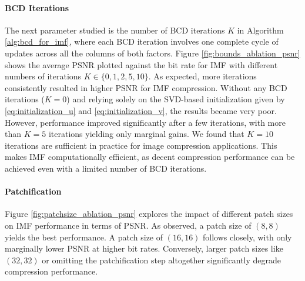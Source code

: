 
\paragraph{BCD Iterations}
The next parameter studied is the number of BCD iterations $K$ in Algorithm \ref{alg:bcd_for_imf}, where each BCD iteration involves one complete cycle of updates across all the columns of both factors. Figure \ref{fig:bounds_ablation_psnr} shows the average PSNR plotted against the bit rate for IMF with different numbers of iterations $K \in \{0, 1, 2, 5, 10\}$. As expected, more iterations consistently resulted in higher PSNR for IMF compression. Without any BCD iterations ($K=0$) and relying solely on the SVD-based initialization given by \eqref{eq:initialization_u} and \eqref{eq:initialization_v}, the results became very poor. However, performance improved significantly after a few iterations, with more than $K=5$ iterations yielding only marginal gains. We found that $K=10$ iterations are sufficient in practice for image compression applications. This makes IMF computationally efficient, as decent compression performance can be achieved even with a limited number of BCD iterations.

\paragraph{Patchification}
Figure \ref{fig:patchsize_ablation_psnr} explores the impact of different patch sizes on IMF performance in terms of PSNR. As observed, a patch size of $(8, 8)$ yields the best performance. A patch size of $(16, 16)$ follows closely, with only marginally lower PSNR at higher bit rates. Conversely, larger patch sizes like $(32, 32)$ or omitting the patchification step altogether significantly degrade compression performance. 

